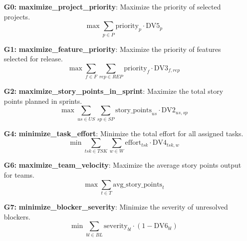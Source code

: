 \documentclass{article}
\begin{document}
\begin{itemize}
    \item[\textbf{G0:}] \textbf{maximize\_project\_priority}: Maximize the priority of selected projects.
    \begin{equation*}
        \max \sum_{p \in P} \text{priority}_p \cdot \text{DV5}_p
    \end{equation*}
    \item[\textbf{G1:}] \textbf{maximize\_feature\_priority}: Maximize the priority of features selected for release.
    \begin{equation*}
        \max \sum_{f \in F} \sum_{rep \in REP} \text{priority}_f \cdot \text{DV3}_{f,rep}
    \end{equation*}
    \item[\textbf{G2:}] \textbf{maximize\_story\_points\_in\_sprint}: Maximize the total story points planned in sprints.
    \begin{equation*}
        \max \sum_{us \in US} \sum_{sp \in SP} \text{story\_points}_{us} \cdot \text{DV2}_{us,sp}
    \end{equation*}
    \item[\textbf{G4:}] \textbf{minimize\_task\_effort}: Minimize the total effort for all assigned tasks.
    \begin{equation*}
        \min \sum_{tsk \in TSK} \sum_{w \in W} \text{effort}_{tsk} \cdot \text{DV4}_{tsk,w}
    \end{equation*}
    \item[\textbf{G6:}] \textbf{maximize\_team\_velocity}: Maximize the average story points output for teams.
    \begin{equation*}
        \max \sum_{t \in T} \text{avg\_story\_points}_t
    \end{equation*}
    \item[\textbf{G7:}] \textbf{minimize\_blocker\_severity}: Minimize the severity of unresolved blockers.
    \begin{equation*}
        \min \sum_{bl \in BL} \text{severity}_{bl} \cdot (1 - \text{DV6}_{bl})
    \end{equation*}
\end{itemize}
\end{document}
